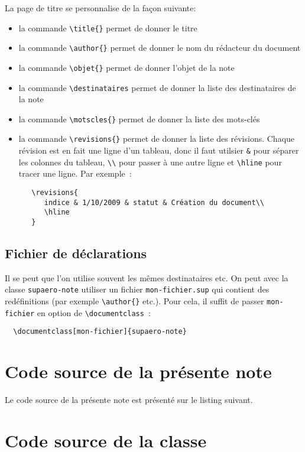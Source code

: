 \documentclass{supaero-note}
\begin{document}
La page de titre se personnalise de la façon suivante:

\begin{itemize}
\item la commande \verb!\title{}! permet de donner le titre
\item la commande \verb!\author{}! permet de donner le nom du
  rédacteur du document
\item la commande \verb!\objet{}! permet de donner l'objet de la note
\item la commande \verb!\destinataires! permet de donner la liste des
  destinataires de la note
\item la commande \verb!\motscles{}! permet de donner la liste des
  mots-clés
\item la commande \verb!\revisions{}! permet de donner la liste des
  révisions. Chaque révision est en fait une ligne d'un tableau, donc
  il faut utilsier \verb!&! pour séparer les colonnes du tableau,
  \verb!\\! pour passer à une autre ligne et \verb!\hline! pour tracer
  une ligne. Par exemple~:

\begin{verbatim}
   \revisions{
      indice & 1/10/2009 & statut & Création du document\\
      \hline
   } 
\end{verbatim}
\end{itemize}

\subsection{Fichier de déclarations}
\label{sec:fich-de-decl}

Il se peut que l'on utilise souvent les mêmes destinataires etc. On
peut avec la classe \texttt{supaero-note} utiliser un fichier
\texttt{mon-fichier.sup} qui contient des redéfinitions (par exemple
\verb!\author{}! etc.). Pour cela, il suffit de passer
\verb!mon-fichier! en option de \verb!\documentclass!~:

\begin{verbatim}
  \documentclass[mon-fichier]{supaero-note}
\end{verbatim}

\section{Code source de la présente note}
\label{sec:code-source}

Le code source de la présente note est présenté sur le listing
suivant.



\section{Code source de la classe}
\label{sec:code-source-supaero-note}





\end{document}
